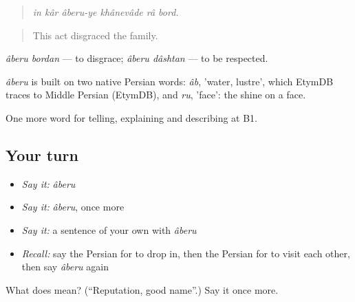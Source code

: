 \begin{quote}
\emph{in kâr âberu-ye khânevâde râ bord.}
\end{quote}

\begin{quote}
This act disgraced the family.
\end{quote}

\emph{âberu bordan} — to disgrace; \emph{âberu dâshtan} — to be respected.

\begin{cousinweb}
\emph{âberu} is built on two native Persian words: \emph{âb}, 'water, lustre', which EtymDB traces to Middle Persian (EtymDB), and \emph{ru}, 'face': the shine on a face.
\end{cousinweb}

\begin{grammarlens}[title={What you've built}]
One more word for telling, explaining and describing at B1.
\end{grammarlens}

\subsection*{Your turn}
\begin{itemize}
\raggedright
  \item \emph{Say it:} \emph{âberu}
  \item \emph{Say it:} \emph{âberu}, once more
  \item \emph{Say it:} a sentence of your own with \emph{âberu}
  \item \emph{Recall:} say the Persian for to drop in, then the Persian for to visit each other, then say \emph{âberu} again
\end{itemize}

\begin{tcolorbox}[breakable,colback=teal!4,colframe=teal!35!black,title={Before you move on}]
What does  mean? (\textquotedblleft{}Reputation, good name\textquotedblright{}.) Say it once more.
\end{tcolorbox}
